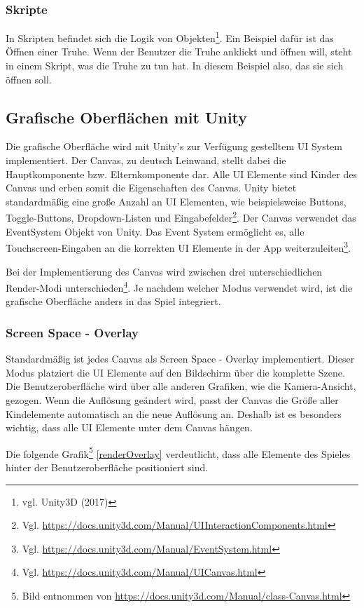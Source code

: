 		\subsubsection{Skripte}
			In Skripten befindet sich die Logik von Objekten\footnote{vgl. Unity3D \cite{unity8} (2017)}. Ein Beispiel dafür ist das Öffnen einer Truhe. Wenn der Benutzer die Truhe anklickt und öffnen will, steht in einem Skript, was die Truhe zu tun hat. In diesem Beispiel also, das sie sich öffnen soll. 

	\subsection{Grafische Oberflächen mit Unity}
		Die grafische Oberfläche wird mit Unity's zur Verfügung gestelltem \ac{UI} System implementiert. Der Canvas, zu deutsch Leinwand, stellt dabei die Hauptkomponente bzw. Elternkomponente dar. Alle \ac{UI} Elemente sind Kinder des Canvas und erben somit die Eigenschaften des Canvas. Unity bietet standardmäßig eine große Anzahl an \ac{UI} Elementen, wie beispielsweise Buttons, Toggle-Buttons, Dropdown-Listen und Eingabefelder\footnote{Vgl. \url{https://docs.unity3d.com/Manual/UIInteractionComponents.html}}. Der Canvas verwendet das EventSystem Objekt von Unity. Das Event System ermöglicht es, alle Touchscreen-Eingaben an die korrekten \ac{UI} Elemente in der App weiterzuleiten\footnote{Vgl. \url{https://docs.unity3d.com/Manual/EventSystem.html}}.

		Bei der Implementierung des Canvas wird zwischen drei unterschiedlichen Render-Modi unterschieden\footnote{Vgl. \url{https://docs.unity3d.com/Manual/UICanvas.html}}. Je nachdem welcher Modus verwendet wird, ist die grafische Oberfläche anders in das Spiel integriert.

		\subsubsection{Screen Space - Overlay}
			Standardmäßig ist jedes Canvas als Screen Space - Overlay implementiert. Dieser Modus platziert die \ac{UI} Elemente auf den Bildschirm über die komplette Szene. Die Benutzeroberfläche wird über alle anderen Grafiken, wie die Kamera-Ansicht, gezogen. Wenn die Auflösung geändert wird, passt der Canvas die Größe aller Kindelemente automatisch an die neue Auflösung an. Deshalb ist es besonders wichtig, dass alle \ac{UI} Elemente unter dem Canvas hängen. 

			Die folgende Grafik\footnote{Bild entnommen von \url{https://docs.unity3d.com/Manual/class-Canvas.html}} \ref{renderOverlay} verdeutlicht, dass alle Elemente des Spieles hinter der Benutzeroberfläche positioniert sind.

